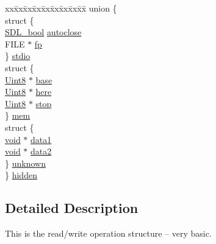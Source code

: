 \begin{DoxyCompactItemize}
\item 
\begin{tabbing}
xx\=xx\=xx\=xx\=xx\=xx\=xx\=xx\=xx\=\kill
union \{\\
\>struct \{\\
\>\>\hyperlink{_s_d_l__stdinc_8h_a8fca68df0f976765230fe589a7c7733b}{SDL\_bool} \hyperlink{struct_s_d_l___r_wops_a2131259969ed1f468e9930548841cd2b}{autoclose}\\
\>\>FILE $\ast$ \hyperlink{struct_s_d_l___r_wops_a1fd8d69542725cd065f8be2398d287fe}{fp}\\
\>\} \hyperlink{struct_s_d_l___r_wops_a644783ed5b6701f6a47942bf2c0795ad}{stdio}\\
\>struct \{\\
\>\>\hyperlink{_s_d_l__stdinc_8h_a2944638813a090aa23e62f4da842c3e2}{Uint8} $\ast$ \hyperlink{struct_s_d_l___r_wops_af9b489d7342296ce197b911cfa93b2ab}{base}\\
\>\>\hyperlink{_s_d_l__stdinc_8h_a2944638813a090aa23e62f4da842c3e2}{Uint8} $\ast$ \hyperlink{struct_s_d_l___r_wops_a6fc84601c17e347c6ef24c63a79deb57}{here}\\
\>\>\hyperlink{_s_d_l__stdinc_8h_a2944638813a090aa23e62f4da842c3e2}{Uint8} $\ast$ \hyperlink{struct_s_d_l___r_wops_a4108a41afa8b62e75b0f160de4b56103}{stop}\\
\>\} \hyperlink{struct_s_d_l___r_wops_a850037e0fc608e382caa9e4cdddefdee}{mem}\\
\>struct \{\\
\>\>\hyperlink{_s_d_l__opengles2__gl2ext_8h_ae5d8fa23ad07c48bb609509eae494c95}{void} $\ast$ \hyperlink{struct_s_d_l___r_wops_ab89d27b4312c0b9d664c81bc92917fc8}{data1}\\
\>\>\hyperlink{_s_d_l__opengles2__gl2ext_8h_ae5d8fa23ad07c48bb609509eae494c95}{void} $\ast$ \hyperlink{struct_s_d_l___r_wops_aca073130e2e262eb11e86e1be993e215}{data2}\\
\>\} \hyperlink{struct_s_d_l___r_wops_a731b73efaba3d5bdc1209ac9c01297a2}{unknown}\\
\} \hyperlink{struct_s_d_l___r_wops_a2bf0dec0395f771b30c841fc7296164b}{hidden}\\

\end{tabbing}\end{DoxyCompactItemize}


\subsection{Detailed Description}
This is the read/write operation structure -- very basic. 

